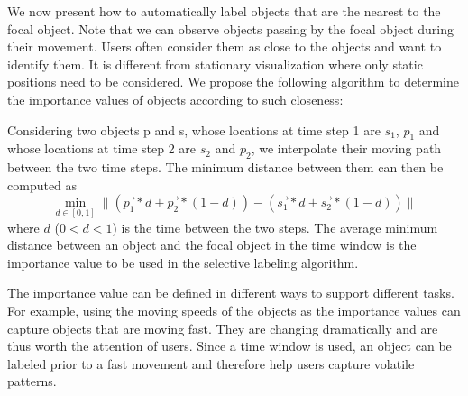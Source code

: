 \documentclass[review]{vgtc}                 %
\begin{document}
We now present how to automatically label objects that are the nearest to the focal object. Note that we can observe objects passing by the focal object during their movement. Users often consider them as close to the objects and want to identify them. It is different from stationary visualization where only static positions need to be considered. We propose the following algorithm to determine the importance values of objects according to such closeness:

Considering two objects p and s, whose locations at time step 1 are $s_{1}$, $p_{1}$ and whose locations at time step 2 are $s_{2}$ and $p_{2}$, we interpolate their moving path between the two time steps. The minimum distance between them can then be computed as
\begin{equation}
\min_{d \in [0,1]}  \parallel  (\overrightarrow{p_1}*d+ \overrightarrow{p_2}*(1-d) )-(
\overrightarrow{s_1}*d+ \overrightarrow{s_2}*(1-d)) \parallel
 \end{equation}
where $d$ ($0<d<1$) is the time between the two steps. The average minimum distance between an object and the focal object in the time window is the importance value to be used in the selective labeling algorithm.

The importance value can be defined in different ways to support different tasks. For example, using the moving speeds of the objects as the importance values can capture objects that are moving fast. They are changing dramatically and are thus worth the attention of users. Since a time window is used, an object can be labeled prior to a fast movement and therefore help users capture volatile patterns.
\end{document}
